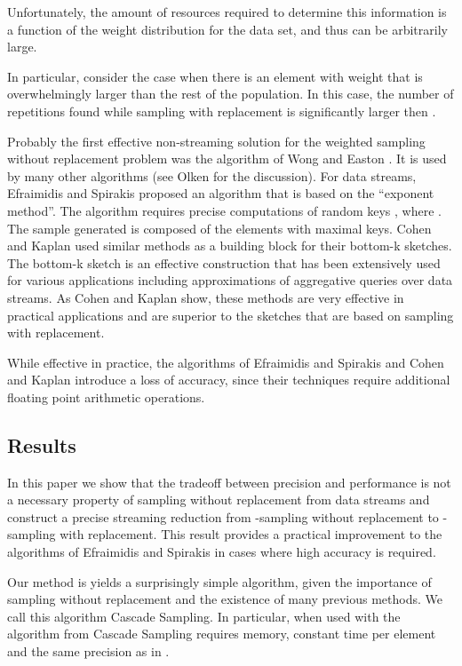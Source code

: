 \documentclass{llncs}
\begin{document}
Unfortunately, the amount of resources required to determine this information is a function of  the weight distribution for the data set, and thus can be arbitrarily large.

In particular, consider the case when there is an element with weight that is overwhelmingly larger than
the rest of the population. In this case, the number of repetitions found while sampling with replacement is significantly larger then .


Probably the first effective non-streaming solution for the weighted sampling without replacement problem was the algorithm
of Wong and Easton \cite{weighted_non_stream}. It is used by many other algorithms (see Olken \cite{olken} for the discussion).
For data streams, Efraimidis and Spirakis \cite{weighted_power} proposed an algorithm that is based on the ``exponent method''.
The algorithm requires precise computations of random keys , where .
The sample generated is composed of the  elements with maximal keys. Cohen and Kaplan \cite{Cohen:2008:TEU:1453856.1453884} used similar methods as a building block for their bottom-k
sketches. The bottom-k sketch is an effective construction that has been extensively used for various
applications including approximations of aggregative queries over data streams. As Cohen and Kaplan \cite{Cohen:2008:TEU:1453856.1453884} show,
these methods are very effective in practical applications and are superior to the sketches that are based on sampling with replacement.

While effective in practice, the algorithms of Efraimidis and Spirakis and Cohen and Kaplan
introduce a loss of accuracy, since their techniques require additional floating point arithmetic operations.



\subsection{Results}

In this paper we show that the tradeoff between precision and performance is not a necessary property of sampling without replacement from data streams and construct a precise streaming reduction from -sampling without replacement to -sampling with replacement. This result provides a practical improvement to the algorithms of Efraimidis and Spirakis in cases where high accuracy is required. 

Our method is yields a surprisingly simple algorithm, given the importance of sampling without replacement and the existence of many previous methods. We call this algorithm Cascade Sampling.
In particular, when used with the algorithm from \cite{joins} Cascade Sampling requires  memory, constant time per element and the same precision as in \cite{joins}. 
\end{document}
